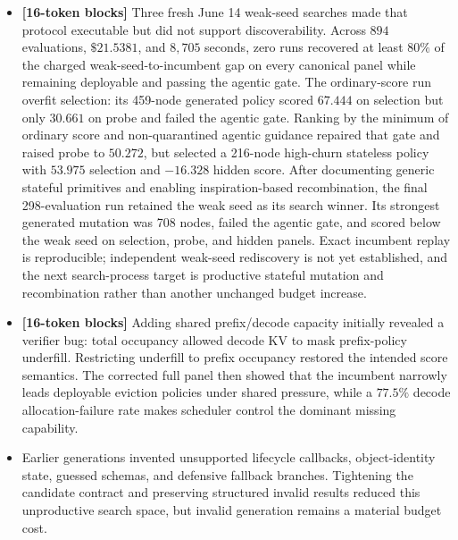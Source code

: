 \documentclass[11pt]{article}
\newcommand{\blocktag}[1]{\textbf{\color{navy}[#1-token blocks]}}
\begin{document}
\begin{itemize}
  \(53.366\) to \(59.404\), recovering \(49.2\%\) of the charged selection gap and
  \(97.0\%\) of the raw selection gap.  It did not establish discoverability: the
  generated policy reached \(1{,}214\) effective nodes, had negative charged probe-gap
  recovery, recovered only \(45.5\%\) of the hidden charged gap, and failed the
  multi-metric agentic gate on admission-waste divergence.  The retained incumbent
  therefore remains a path-dependent local-evolution result until repeated neutral
  weak-seed runs pass the separate behavioral rediscovery protocol.
  \item \blocktag{16} Three fresh June 14 weak-seed searches made that protocol
  executable but did not support discoverability.  Across \(894\) evaluations,
  \(\$21.5381\), and \(8{,}705\) seconds, zero runs recovered at least \(80\%\) of
  the charged weak-seed-to-incumbent gap on every canonical panel while remaining
  deployable and passing the agentic gate.  The ordinary-score run overfit selection:
  its 459-node generated policy scored \(67.444\) on selection but only \(30.661\)
  on probe and failed the agentic gate.  Ranking by the minimum of ordinary score and
  non-quarantined agentic guidance repaired that gate and raised probe to \(50.272\),
  but selected a 216-node high-churn stateless policy with \(53.975\) selection and
  \(-16.328\) hidden score.  After documenting generic stateful primitives and
  enabling inspiration-based recombination, the final 298-evaluation run retained
  the weak seed as its search winner.  Its strongest generated mutation was 708
  nodes, failed the agentic gate, and scored below the weak seed on selection, probe,
  and hidden panels.  Exact incumbent replay is reproducible; independent weak-seed
  rediscovery is not yet established, and the next search-process target is
  productive stateful mutation and recombination rather than another unchanged
  budget increase.
  \item \blocktag{16} Adding shared prefix/decode capacity initially revealed a verifier bug: total
  occupancy allowed decode KV to mask prefix-policy underfill.  Restricting underfill
  to prefix occupancy restored the intended score semantics.  The corrected full panel
  then showed that the incumbent narrowly leads deployable eviction policies under
  shared pressure, while a \(77.5\%\) decode allocation-failure rate makes scheduler
  control the dominant missing capability.
  \item Earlier generations invented unsupported lifecycle callbacks, object-identity
  state, guessed schemas, and defensive fallback branches.  Tightening the candidate
  contract and preserving structured invalid results reduced this unproductive search
  space, but invalid generation remains a material budget cost.
\end{itemize}
\end{document}
